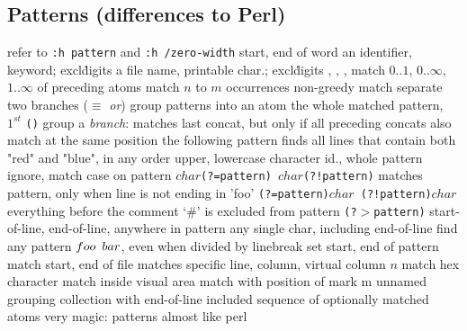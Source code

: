 \subsection{Patterns (differences to Perl)}	{refer to {\tt :h pattern} and {\tt :h /zero-width} }
\cmdOper{\bs$<$ \bs$>$ }	{start, end of word}
	{an identifier, keyword; excl\. digits}
	{a file name, printable char.; excl\. digits}
	{, , \key{\enter}, \key{$\gets$}}
\cmdOper{\bs = * \bs + }	{match $0..1$, $0..\infty$, $1..\infty$ of preceding atoms}
	{match $n$ to $m$ occurrences}
\cmdOper{\bs$\{-\}$ }	{non-greedy match}
\cmdOper{\bs$|$ }	{separate two branches ($\equiv$ {\it or\/})}
\cmdOper{\bs( \bs) }	{group patterns into an atom}
	{the whole matched pattern, $1^{st}$ {\tt()} group}
\cmdOper{\bs \& }	{a {\it branch}: matches last concat, but only if all preceding concats also match at the same position}
	{the following pattern finds all lines that contain both "red" and "blue", in any order}
	{upper, lowercase character}
	{id., whole pattern}
	{ignore, match case on pattern}
	{\tt $char$(?=pattern) $char$(?!pattern)\rm}
	{matches pattern, only when line is not ending in 'foo'}
	{\tt (?=pattern)$char$ (?!pattern)$char$\rm}
	{everything before the
comment `\#' is excluded from pattern}
	{\tt (?$>$pattern)\rm }
\cmdOper{\bs\_\^{} \bs\_\$ }	{start-of-line, end-of-line, anywhere in pattern}
	{any single char, including end-of-line}
	{find any pattern $foo\enskip bar$, even when divided by linebreak}
	{set start, end of pattern}
\cmdOper{\bs \%\^{} \bs\%\$ }	{match start, end of file}
	{matches specific line, column, virtual column $n$}
	{match hex character}
	{match inside visual area}
	{match with position of mark m}
\cmdOper{\bs\%(\bs) }	{unnamed grouping}
\cmdOper{\bs\_$[$ $]$ }	{collection with end-of-line included}
\cmdOper{\bs\%$[$ $]$ }	{sequence of optionally matched atoms}
	{very magic: patterns almost like perl}

